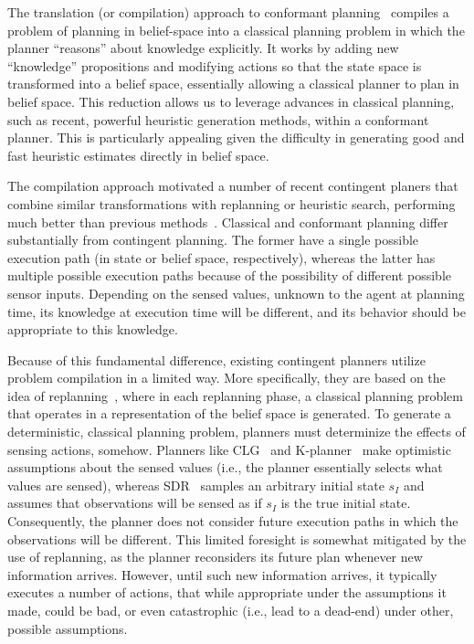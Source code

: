 \documentclass[letterpaper]{article}
\numberwithin{equation}{section}	%
\begin{document}
The translation (or compilation) approach to conformant planning~\citep{PalaciosG09}
compiles a problem of planning in belief-space into a classical planning problem
in which the planner ``reasons'' about knowledge explicitly. It works by adding
new ``knowledge'' propositions and modifying actions so that the state space is transformed into a belief space,
essentially allowing a classical planner to plan in belief space.
This reduction allows us to leverage advances in classical planning, such as recent, powerful
heuristic generation methods, within a conformant planner. This is particularly appealing given the difficulty in generating good and fast heuristic estimates directly in belief space.

The compilation approach motivated
a number of recent contingent planers that combine similar transformations
with replanning or heuristic search, performing much better than previous
methods~\citep{AlborePG09,SDR,BG11}.
Classical and conformant planning differ substantially from contingent planning.
The former have a single possible execution path (in state or belief space, respectively), whereas
the latter has multiple possible execution paths because of the possibility of different
possible sensor inputs. Depending on the sensed values, unknown to the agent at planning time,
its knowledge at execution time will be different, and its behavior should be appropriate to this knowledge.

Because of this fundamental difference, existing contingent planners utilize problem compilation
in a limited way. More specifically, they are based on the idea of replanning~\citep{FFReplan}, where in each
replanning phase, a classical planning problem that operates in a representation of the belief space is generated.
To generate a deterministic, classical planning problem, planners must determinize the effects of
sensing actions, somehow. Planners like CLG~\citep{AlborePG09} and K-planner~\citep{BG11} make optimistic
assumptions about the sensed values (i.e., the planner essentially selects what values are sensed),
whereas SDR~\citep{SDR} samples an arbitrary initial state $s_I$ and assumes that observations will be sensed as if $s_I$ is the true initial state. Consequently, the planner does not consider future
execution paths in which the observations will be different.
This limited foresight is somewhat mitigated by the use of replanning, as the planner reconsiders its
future plan whenever new information arrives. However, until such new information arrives, it typically
executes a number of actions, that while appropriate under the assumptions it made, could be bad,
or even catastrophic (i.e., lead to a dead-end) under other, possible assumptions.
\end{document}

